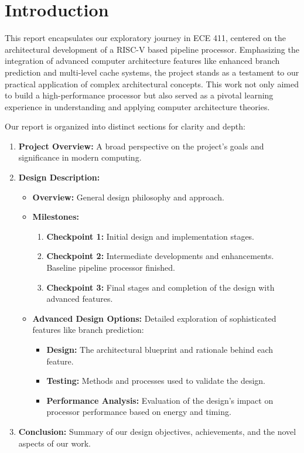 \documentclass[12pt, a4paper]{article}
\begin{document}



    \section{Introduction}
    This report encapsulates our exploratory journey in ECE 411, centered on the architectural development of a RISC-V based pipeline processor. Emphasizing the integration of advanced computer architecture features like enhanced branch prediction and multi-level cache systems, the project stands as a testament to our practical application of complex architectural concepts. This work not only aimed to build a high-performance processor but also served as a pivotal learning experience in understanding and applying computer architecture theories.

    Our report is organized into distinct sections for clarity and depth:
    \begin{enumerate}
        \item \textbf{Project Overview:} A broad perspective on the project’s goals and significance in modern computing.
        \item \textbf{Design Description:}
        \begin{itemize}
            \item \textbf{Overview:} General design philosophy and approach.
            \item \textbf{Milestones:}
            \begin{enumerate}
                \item \textbf{Checkpoint 1:} Initial design and implementation stages.
                \item \textbf{Checkpoint 2:} Intermediate developments and enhancements. Baseline pipeline processor finished.
                \item \textbf{Checkpoint 3:} Final stages and completion of the design with advanced features.
            \end{enumerate}
            \item \textbf{Advanced Design Options:} Detailed exploration of sophisticated features like branch prediction:
            \begin{itemize}
                \item \textbf{Design:} The architectural blueprint and rationale behind each feature.
                \item \textbf{Testing:} Methods and processes used to validate the design.
                \item \textbf{Performance Analysis:} Evaluation of the design's impact on processor performance based on energy and timing.
            \end{itemize}
        \end{itemize}
        \item \textbf{Conclusion:} Summary of our design objectives, achievements, and the novel aspects of our work.
    \end{enumerate}
\end{document}
